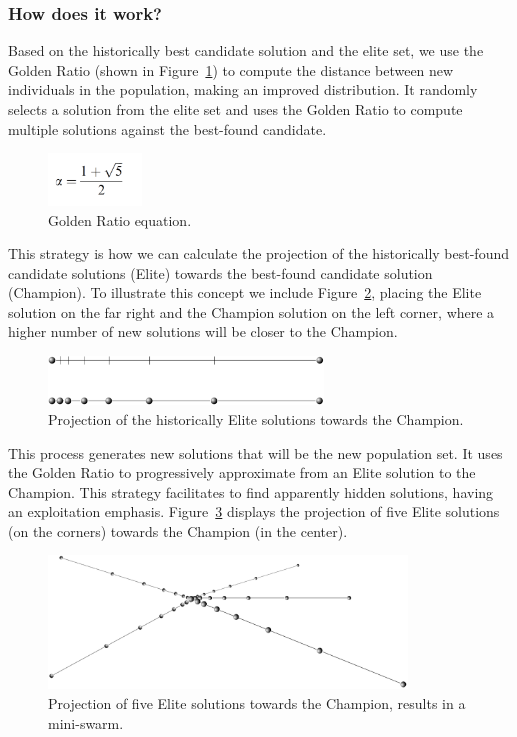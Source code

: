\documentclass[graybox]{svmult}
\begin{document}
\subsubsection{How does it work?} Based on the historically best candidate
solution and the elite set, we use the Golden Ratio (shown in
Figure~\ref{fig.golden_ratio}) to compute the distance between new individuals
in the population, making an improved distribution. It randomly selects a
solution from the elite set and uses the Golden Ratio to compute multiple
solutions against the best-found candidate.

\begin{figure}
    \centering
    \includegraphics[width=25mm]{img/fig_golden_ratio.pdf}
    \caption{Golden Ratio equation.} \label{fig.golden_ratio}
    \end{figure}

This strategy is how we can calculate the projection of the historically
best-found candidate solutions (Elite) towards the best-found candidate
solution (Champion). To illustrate this concept we include
Figure~\ref{fig.elite_projection}, placing the Elite solution on the far right
and the Champion solution on the left corner, where a higher number of new
solutions will be closer to the Champion.

\begin{figure}
    \centering
    \includegraphics[width=0.65\textwidth]{img/fig_elite_projection.pdf}
    \caption{Projection of the historically Elite solutions towards the Champion.} \label{fig.elite_projection}
    \end{figure}

This process generates new solutions that will be the new population set. It
uses the Golden Ratio to progressively approximate from an Elite solution to
the Champion. This strategy facilitates to find apparently hidden solutions,
having an exploitation emphasis. Figure~\ref{fig.elite_projection_swarm}
displays the projection of five Elite solutions (on the corners) towards the
Champion (in the center).

\begin{figure}
    \centering
    \includegraphics[width=0.85\textwidth]{img/fig_elite_projection_swarm.pdf}
    \caption{Projection of five Elite solutions towards the Champion, results in a mini-swarm.} \label{fig.elite_projection_swarm}
    \end{figure}
\end{document}

